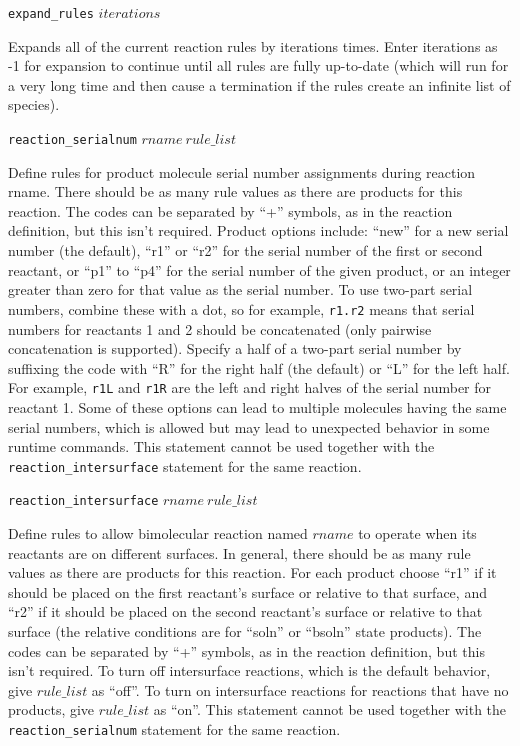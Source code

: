 \documentclass {book}
\newcommand {\ttt} {\texttt}
\begin{document}
\begin{description}
\item{\ttt{expand\_rules} $iterations$}

Expands all of the current reaction rules by iterations times. Enter iterations as -1 for expansion to continue until all rules are fully up-to-date (which will run for a very long time and then cause a termination if the rules create an infinite list of species).

\item{\ttt{reaction\_serialnum} $rname\ rule\_list$}

Define rules for product molecule serial number assignments during reaction rname. There should be as many rule values as there are products for this reaction. The codes can be separated by ``+'' symbols, as in the reaction definition, but this isn't required. Product options include: ``new'' for a new serial number (the default), ``r1'' or ``r2'' for the serial number of the first or second reactant, or ``p1'' to ``p4'' for the serial number of the given product, or an integer greater than zero for that value as the serial number. To use two-part serial numbers, combine these with a dot, so for example, \ttt{r1.r2} means that serial numbers for reactants 1 and 2 should be concatenated (only pairwise concatenation is supported). Specify a half of a two-part serial number by suffixing the code with ``R'' for the right half (the default) or ``L'' for the left half. For example, \ttt{r1L} and \ttt{r1R} are the left and right halves of the serial number for reactant 1. Some of these options can lead to multiple molecules having the same serial numbers, which is allowed but may lead to unexpected behavior in some runtime commands. This statement cannot be used together with the \ttt{reaction\_intersurface} statement for the same reaction.

\item{\ttt{reaction\_intersurface} $rname\ rule\_list$}

Define rules to allow bimolecular reaction named $rname$ to operate when its reactants are on different surfaces. In general, there should be as many rule values as there are products for this reaction. For each product choose ``r1'' if it should be placed on the first reactant's surface or relative to that surface, and ``r2'' if it should be placed on the second reactant's surface or relative to that surface (the relative conditions are for ``soln'' or ``bsoln'' state products). The codes can be separated by ``+'' symbols, as in the reaction definition, but this isn't required. To turn off intersurface reactions, which is the default behavior, give $rule\_list$ as ``off''. To turn on intersurface reactions for reactions that have no products, give $rule\_list$ as ``on''. This statement cannot be used together with the \ttt{reaction\_serialnum} statement for the same reaction.


\end{description}
\end{document}
